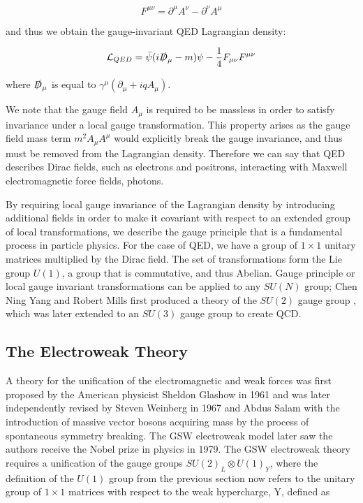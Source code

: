 \begin{equation}
F^{\mu \nu} = \partial^{\mu}A^{\nu} - \partial^{\nu}A^{\mu}
\end{equation}

and thus we obtain the gauge-invariant QED Lagrangian density:

\begin{equation}
\mathcal{L}_{QED} = \bar{\psi}(i \slashed{D}_{\mu} - m) \psi - \frac{1}{4}F_{\mu \nu}F^{\mu \nu}
\end{equation}

where $\slashed{D}_{\mu}$ is equal to $\gamma^{\mu}(\partial_{\mu} + iqA_{\mu})$.

We note that the gauge field $A_{\mu}$ is required to be massless in order to satisfy invariance under a local gauge transformation. This property arises as the gauge field mass term $m^2A_{\mu}A^{\mu}$ would explicitly break the gauge invariance, and thus must be removed from the Lagrangian density. Therefore we can say that QED describes Dirac fields, such as electrons and positrons, interacting with Maxwell electromagnetic force fields, photons.

By requiring local gauge invariance of the Lagrangian density by introducing additional fields in order to make it covariant with respect to an extended group of local transformations, we describe the gauge principle that is a fundamental process in particle physics. For the case of QED, we have a group of $1 \times 1$ unitary matrices multiplied by the Dirac field. The set of transformations form the Lie group $U(1)$, a group that is commutative, and thus Abelian. Gauge principle or local gauge invariant transformations can be applied to any $SU(N)$ group; Chen Ning Yang and Robert Mills first produced a theory of the $SU(2)$ gauge group \cite{PhysRev.96.191}, which was later extended to an $SU(3)$ gauge group to create QCD.  

\subsection{The Electroweak Theory} \label{subsec-ElectroweakTheory}

A theory for the unification of the electromagnetic and weak forces was first proposed by the American physicist Sheldon Glashow in 1961 \cite{Glashow:1961tr} and was later independently revised by Steven Weinberg in 1967 \cite{PhysRevLett.19.1264} and Abdus Salam \cite{Salam:1959zz} with the introduction of massive vector bosons acquiring mass by the process of spontaneous symmetry breaking. The GSW electroweak model later saw the authors receive the Nobel prize in physics in 1979. The GSW electroweak theory requires a unification of the gauge groups $SU(2)_L \otimes U(1)_Y$, where the definition of the $U(1)$ group from the previous section now refers to the unitary group of $1 \times 1$ matrices with respect to the weak hypercharge, Y, defined as 

